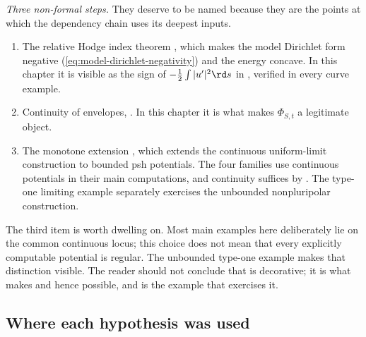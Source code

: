 \emph{Three non-formal steps.}  They deserve to be named because they are
the points at which the dependency chain uses its deepest inputs.
\begin{enumerate}
\item\label{itm:ch31-hard:hodge}
 The relative Hodge index theorem , which makes
 the model Dirichlet form negative
 (\eqref{eq:model-dirichlet-negativity}) and the energy concave.  In this
 chapter it is visible as the sign of $-\tfrac12\int|u'|^2\rd s$ in
 , verified in every curve example.
\item\label{itm:ch31-hard:envelope}
 Continuity of envelopes, .  In this
 chapter it is what makes $\Phi_{S,t}$ a legitimate object.
\item\label{itm:ch31-hard:monotone}
 The monotone extension , which extends the
 continuous uniform-limit construction to bounded psh potentials.  The
 four families use continuous potentials in their main computations, and continuity suffices by
 .  The type-one limiting example
  separately exercises the unbounded
 nonpluripolar construction.
\end{enumerate}
The third item is worth dwelling on.  Most main examples here deliberately lie on the common continuous locus;
this choice does not mean that every explicitly computable potential is
regular.  The unbounded type-one example makes that distinction visible.  The reader should not conclude that
 is decorative; it is what makes
 and hence 
possible, and  is the example that exercises it.

\subsection{Where each hypothesis was used}
\label{sec:ch31-hypothesis-use}

